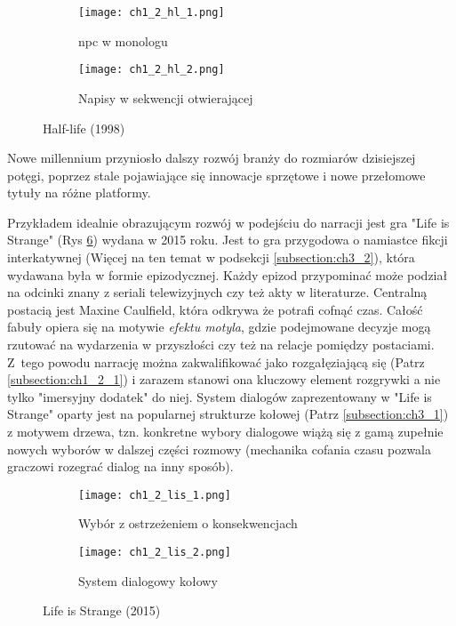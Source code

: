 \begin{figure}[h]
    \begin{subfigure}{0.49\textwidth}
        \caption{\gls{npc} w monologu}
        \texttt{[image: ch1\_2\_hl\_1.png]}
        \label{subfig:ch_1_2_hl_1}
    \end{subfigure}
    \begin{subfigure}{0.49\textwidth}
        \caption{Napisy w sekwencji otwierającej}
        \texttt{[image: ch1\_2\_hl\_2.png]}
        \label{subfig:ch_1_2_hl_2}
    \end{subfigure}
    \caption{Half-life (1998)}
    \label{fig:ch1_2_hl}
\end{figure}

\newpage

Nowe millennium przyniosło dalszy rozwój branży do rozmiarów dzisiejszej potęgi, poprzez stale
pojawiające się innowacje sprzętowe i nowe przełomowe tytuły na różne platformy.

Przykładem idealnie obrazującym rozwój w podejściu do narracji jest gra "Life is Strange" (Rys \ref{fig:ch1_2_lis})
wydana w 2015 roku. Jest to gra przygodowa o namiastce fikcji interkatywnej (Więcej na ten temat
w podsekcji \ref{subsection:ch3_2}), która wydawana była w formie epizodycznej. Każdy epizod
przypominać może podział na odcinki znany z seriali telewizyjnych czy też akty w literaturze.
Centralną postacią jest Maxine Caulfield, która odkrywa że potrafi cofnąć czas. Całość fabuły opiera się
na motywie \textit{efektu motyla}, gdzie podejmowane decyzje mogą rzutować na wydarzenia w przyszłości czy
też na relacje pomiędzy postaciami. Z~tego powodu narrację można zakwalifikować jako rozgałęziającą się
(Patrz \ref{subsection:ch1_2_1}) i zarazem stanowi ona kluczowy element rozgrywki a nie tylko
"imersyjny dodatek" do niej. System dialogów zaprezentowany w "Life is Strange" oparty jest na popularnej
strukturze kołowej (Patrz \ref{subsection:ch3_1}) z motywem drzewa, tzn. konkretne wybory dialogowe
wiążą się z gamą zupełnie nowych wyborów w dalszej części rozmowy (mechanika cofania czasu pozwala
graczowi rozegrać dialog na inny sposób).

\begin{figure}[h]
    \begin{subfigure}{0.49\textwidth}
        \caption{Wybór z ostrzeżeniem o konsekwencjach}
        \texttt{[image: ch1\_2\_lis\_1.png]}
        \label{subfig:ch_1_2_lis_1}
    \end{subfigure}
    \begin{subfigure}{0.49\textwidth}
        \caption{System dialogowy kołowy}
        \texttt{[image: ch1\_2\_lis\_2.png]}
        \label{subfig:ch_1_2_lis_2}
    \end{subfigure}
    \caption{Life is Strange (2015)}
    \label{fig:ch1_2_lis}
\end{figure}

